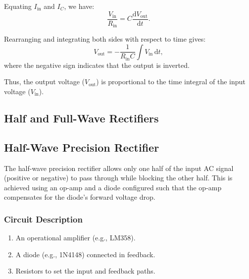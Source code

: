 \documentclass[journal]{IEEEtran}
\begin{document}
	Equating \(I_{\text{in}}\) and \(I_C\), we have:
	\[
	\frac{V_{\text{in}}}{R_{\text{in}}} = C \frac{\mathrm{d}V_{\text{out}}}{\mathrm{d}t}.
	\]
	
	Rearranging and integrating both sides with respect to time gives:
	\[
	V_{\text{out}} = -\frac{1}{R_{\text{in}}C} \int V_{\text{in}} \, \mathrm{d}t,
	\]
	where the negative sign indicates that the output is inverted.
	
	Thus, the output voltage (\(V_{\text{out}}\)) is proportional to the time integral of the input voltage (\(V_{\text{in}}\)).

	\subsection{Half and Full-Wave Rectifiers}
	
	\subsection*{Half-Wave Precision Rectifier}
	
	The half-wave precision rectifier allows only one half of the input AC signal (positive or negative) to pass through while blocking the other half. This is achieved using an op-amp and a diode configured such that the op-amp compensates for the diode's forward voltage drop.
	
	\subsubsection*{Circuit Description}
	\begin{enumerate}
		\item An operational amplifier (e.g., LM358).
		\item A diode (e.g., 1N4148) connected in feedback.
		\item Resistors to set the input and feedback paths.
	\end{enumerate}
	
\end{document}
